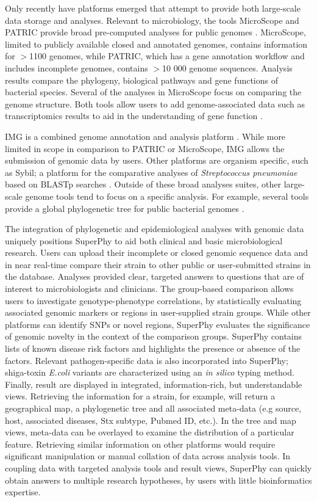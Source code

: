\documentclass[a4paper,twoside]{article}
\begin{document}
Only recently have platforms emerged that attempt to provide both large-scale data storage and analyses. Relevant to microbiology, the tools MicroScope and PATRIC provide broad pre-computed analyses for public genomes \cite{vallenet_microscope--integrated_2012,wattam2013}.  MicroScope, limited to publicly available closed and annotated genomes, contains information for $>$1100 genomes, while PATRIC, which has a gene annotation workflow and includes incomplete genomes, contains $>$10 000 genome sequences. Analysis results compare the phylogeny, biological pathways and gene functions of bacterial species. Several of the analyses in MicroScope focus on comparing the genome structure. Both tools allow users to add genome-associated data such as transcriptomics results to aid in the understanding of gene function \cite{vallenet_microscope--integrated_2012,wattam2013}. 

IMG is a combined genome annotation and analysis platform \cite{marko2013}. While more limited in scope in comparison to PATRIC or MicroScope, IMG allows the submission of genomic data by users. Other platforms are organism specific, such as Sybil; a platform for the comparative analyses of \textit{Streptococcus pneumoniae} based on BLASTp searches \cite{riley_using_2012}. Outside of these broad analyses suites, other large-scale genome tools tend to focus on a specific analysis. For example, several tools provide a global phylogenetic tree for public bacterial genomes \cite{letunic2011,fang2013,federhen2012}.

The integration of phylogenetic and epidemiological analyses with genomic data uniquely positions SuperPhy to aid both clinical and basic microbiological research. Users can upload their incomplete or closed genomic sequence data and in near real-time compare their strain to other public or user-submitted strains in the database. Analyses provided clear, targeted answers to questions that are of interest to microbiologists and clinicians.  The group-based comparison allows users to investigate genotype-phenotype correlations, by statistically evaluating associated genomic markers or regions in user-supplied strain groups. While other platforms can identify SNPs or novel regions, SuperPhy evaluates the significance of genomic novelty in the context of the comparison groups. SuperPhy contains lists of known disease risk factors and highlights the presence or absence of the factors. Relevant pathogen-specific data is also incorporated into SuperPhy; shiga-toxin \textit{E.coli} variants are characterized using an \textit{in silico} typing method. Finally, result are displayed in integrated, information-rich, but understandable views. Retrieving the information for a strain, for example, will return a geographical map, a phylogenetic tree and all associated meta-data (e.g source, host, associated diseases, Stx subtype, Pubmed ID, etc.). In the tree and map views, meta-data can be overlayed to examine the distribution of a particular feature.  Retrieving similar information on other platforms would require significant manipulation or manual collation of data across analysis tools. In coupling data with targeted analysis tools and result views, SuperPhy can quickly obtain answers to multiple research hypotheses, by users with little bioinformatics expertise.
\end{document}
